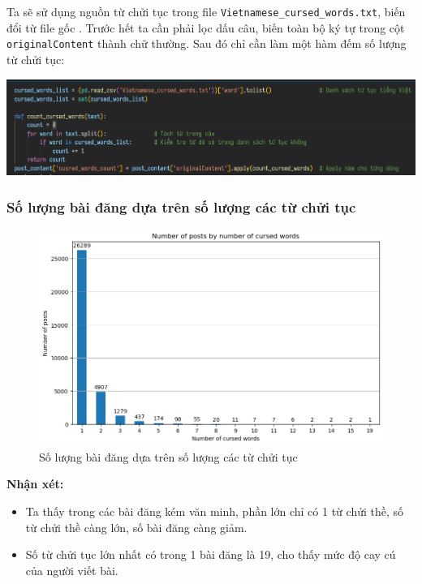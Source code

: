 Ta sẽ sử dụng nguồn từ chửi tục trong file \texttt{Vietnamese\_cursed\_words.txt}, biến đổi từ file gốc \cite{vnoffensive}. Trước hết ta cần phải lọc dấu câu, biến toàn bộ ký tự trong cột \texttt{originalContent} thành chữ thường. Sau đó chỉ cần làm một hàm đếm số lượng từ chửi tục:

\begin{center}
    \includegraphics[width=1\linewidth]{images/code-2.24.png}
\end{center}

\subsubsection{Số lượng bài đăng dựa trên số lượng các từ chửi tục}
  \begin{figure}[H]
      \centering
      \includegraphics[width=0.8\linewidth]{images/C2_pic39.png}
      \caption{Số lượng bài đăng dựa trên số lượng các từ chửi tục}
      \vspace{-1em}
      \label{fig:2.23}
  \end{figure}
    
\textbf{Nhận xét:}
\begin{itemize}
    \item Ta thấy trong các bài đăng kém văn minh, phần lớn chỉ có 1 từ chửi thề, số từ chửi thề càng lớn, số bài đăng càng giảm.
    \item Số từ chửi tục lớn nhất có trong 1 bài đăng là 19, cho thấy mức độ cay cú của người viết bài.
\end{itemize}

